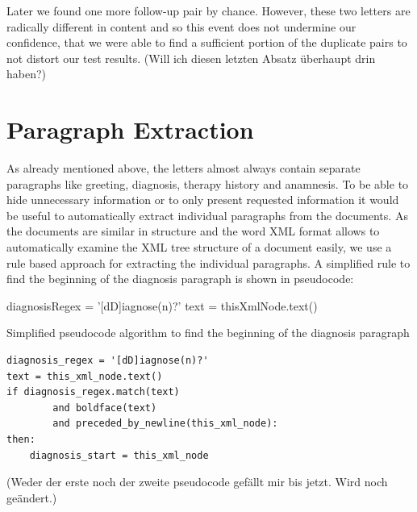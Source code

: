 Later we found one more follow-up pair by chance. However, these two
letters are radically different in content and so this event does
not undermine our confidence, that we were able to find a sufficient
portion of the duplicate pairs to not distort our test results. (Will ich diesen letzten Absatz überhaupt drin haben?)


\section{Paragraph Extraction}

As already mentioned above, the letters almost always contain separate
paragraphs like greeting, diagnosis, therapy history and anamnesis.
To be able to hide unnecessary information or to only present requested
information it would be useful to automatically extract individual
paragraphs from the documents. As the documents are similar in structure
and the word XML format allows to automatically examine the XML tree
structure of a document easily, we use a rule based approach for extracting
the individual paragraphs. A simplified rule to find the beginning of the diagnosis paragraph is shown in pseudocode:
\bigskip

\begin{algorithm}[H]
	\DontPrintSemicolon
	diagnosisRegex = '[dD]iagnose(n)?'\;
	text = thisXmlNode.text()\;

\caption{Simplified pseudocode algorithm to find the beginning of the diagnosis paragraph}
\end{algorithm}

\bigskip
\bigskip

\begin{lstlisting}
diagnosis_regex = '[dD]iagnose(n)?'
text = this_xml_node.text()
if diagnosis_regex.match(text)
		and boldface(text)
		and preceded_by_newline(this_xml_node):
then:
	diagnosis_start = this_xml_node
\end{lstlisting}

\bigskip
(Weder der erste noch der zweite pseudocode gefällt mir bis jetzt. Wird noch geändert.)


